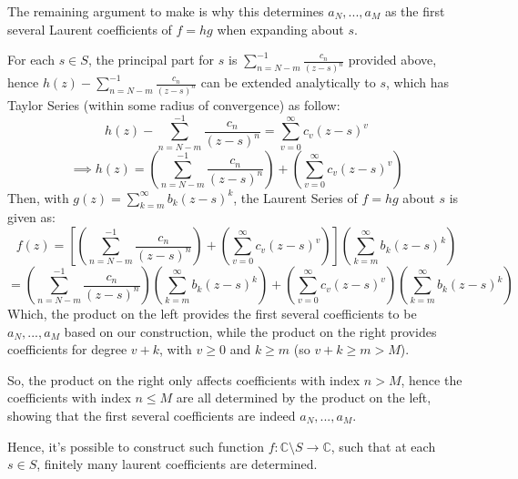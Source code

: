 \documentclass{article}
\begin{document}
\hfil

The remaining argument to make is why this determines $a_N,...,a_M$ as the first several Laurent coefficients of $f=hg$ when expanding about $s$.

For each $s\in S$, the principal part for $s$ is $\sum_{n=N-m}^{-1}\frac{c_n}{(z-s)^n}$ provided above, hence $h(z)-\sum_{n=N-m}^{-1}\frac{c_n}{(z-s)^n}$ can be extended analytically to $s$, which has Taylor Series (within some radius of convergence) as follow:
$$h(z)-\sum_{n=N-m}^{-1}\frac{c_n}{(z-s)^n}=\sum_{v=0}^{\infty}c_v(z-s)^v$$
$$\implies h(z)=\left(\sum_{n=N-m}^{-1}\frac{c_n}{(z-s)^n}\right)+\left(\sum_{v=0}^{\infty}c_v(z-s)^v\right)$$
Then, with $g(z)=\sum_{k=m}^{\infty}b_k(z-s)^k$, the Laurent Series of $f=hg$ about $s$ is given as:
$$f(z)=\left[\left(\sum_{n=N-m}^{-1}\frac{c_n}{(z-s)^n}\right)+\left(\sum_{v=0}^{\infty}c_v(z-s)^v\right)\right]\left(\sum_{k=m}^{\infty}b_k(z-s)^k\right)$$
$$=\left(\sum_{n=N-m}^{-1}\frac{c_n}{(z-s)^n}\right)\left(\sum_{k=m}^{\infty}b_k(z-s)^k\right)+\left(\sum_{v=0}^{\infty}c_v(z-s)^v\right)\left(\sum_{k=m}^{\infty}b_k(z-s)^k\right)$$
Which, the product on the left provides the first several coefficients to be $a_N,...,a_M$ based on our construction,
while the product on the right provides coefficients for degree $v+k$, with $v\geq 0$ and $k\geq m$ (so $v+k\geq m>M$).

So, the product on the right only affects coefficients with index $n>M$, hence the coefficients with index $n\leq M$ are all determined by the product on the left, showing that the first several coefficients are indeed $a_N,...,a_M$.

Hence, it's possible to construct such function $f:\mathbb{C}\setminus S\rightarrow \mathbb{C}$, such that at each $s\in S$, finitely many laurent coefficients are determined.

\break
\end{document}
